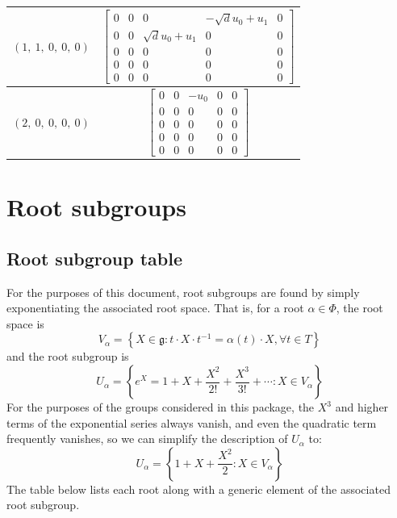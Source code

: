 \documentclass[11pt]{article}
\newcommand{\noi}{\noindent}
\newcommand{\inv}{^{-1}}
\newcommand{\lb}{\left\{}
\newcommand{\rb}{\right\}}
\newcommand{\frakg}{\mathfrak{g}}
\theoremstyle{definition}
\begin{document}
\begin{longtable}{|l|c|}
    \hline
    $\left( 1, \  1, \  0, \  0, \  0\right)$ & ${\left[\begin{matrix}0 & 0 & 0 & - \sqrt{d} u_{0} + u_{1} & 0\\0 & 0 & \sqrt{d} u_{0} + u_{1} & 0 & 0\\0 & 0 & 0 & 0 & 0\\0 & 0 & 0 & 0 & 0\\0 & 0 & 0 & 0 & 0\end{matrix}\right]}$ \\
    \hline
    $\left( 2, \  0, \  0, \  0, \  0\right)$ & ${\left[\begin{matrix}0 & 0 & - u_{0} & 0 & 0\\0 & 0 & 0 & 0 & 0\\0 & 0 & 0 & 0 & 0\\0 & 0 & 0 & 0 & 0\\0 & 0 & 0 & 0 & 0\end{matrix}\right]}$ \\
    \hline
\end{longtable}


\newpage
\section{Root subgroups}

\subsection{Root subgroup table}

\noi For the purposes of this document, root subgroups are found by simply exponentiating the associated root space. That is, for a root $\alpha \in \Phi$, the root space is
\[
	V_\alpha = \lb X \in \frakg : t \cdot X \cdot t \inv = \alpha(t) \cdot X, \forall t \in T \rb
\]
and the root subgroup is
\[
	U_\alpha = \lb e^X = 1 + X + \frac{X^2}{2!} + \frac{X^3}{3!} + \cdots : X \in V_\alpha \rb
\]
For the purposes of the groups considered in this package, the $X^3$ and higher terms of the exponential series always vanish, and even the quadratic term frequently vanishes, so we can simplify the description of $U_\alpha$ to:
\[
	U_\alpha = \lb 1 + X + \frac{X^2}{2} : X \in V_\alpha \rb
\]
The table below lists each root along with a generic element of the associated root subgroup.
\end{document}
